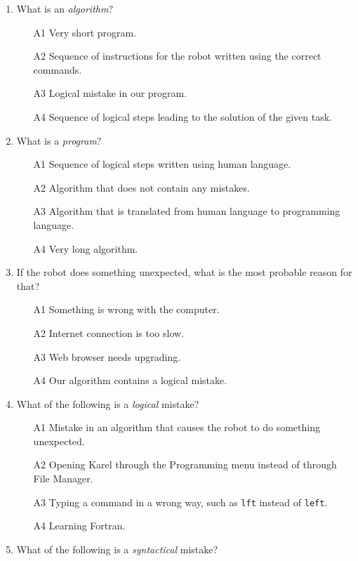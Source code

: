 {{\begin{enumerate}
\item What is an {\em algorithm}?
\begin{enumerate}
\item[A1] Very short program.
\item[A2] Sequence of instructions for the robot written using the correct commands.
\item[A3] Logical mistake in our program.
\item[A4] Sequence of logical steps leading to the solution of the given task.
\end{enumerate}
\item What is a {\em program}?
\begin{enumerate}
\item[A1] Sequence of logical steps written using human language.
\item[A2] Algorithm that does not contain any mistakes.
\item[A3] Algorithm that is translated from human language to programming language.
\item[A4] Very long algorithm.
\end{enumerate}
\item If the robot does something unexpected, what is the most probable reason for that?
\begin{enumerate}
\item[A1] Something is wrong with the computer.
\item[A2] Internet connection is too slow.
\item[A3] Web browser needs upgrading.
\item[A4] Our algorithm contains a logical mistake.
\end{enumerate}
\item What of the following is a {\em logical} mistake?
\begin{enumerate}
\item[A1] Mistake in an algorithm that causes the robot to do something unexpected.
\item[A2] Opening Karel through the Programming menu instead of through File Manager. 
\item[A3] Typing a command in a wrong way, such as {\tt lft} instead of {\tt left}.
\item[A4] Learning Fortran.
\end{enumerate}
\item What of the following is a {\em syntactical} mistake?
\begin{enumerate}

\end{enumerate}
\end{enumerate}}}
